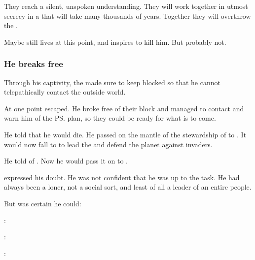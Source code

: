 They reach a silent, unspoken understanding. 
They will work together in utmost secrecy in a \XanatosGambit{} that will take many thousands of years. 
Together they will overthrow the \banes. 

Maybe \Damiarch{} still lives at this point, and \Nexagglachel{} inspires \Azraid{} to kill him. 
But probably not. 





\subsubsection{He breaks free}
Through his captivity, the \resphain{} made sure to keep \Nexagglachel{} blocked so that he cannot telepathically contact the outside world. 

At one point \Nexagglachel{} escaped. 
He broke free of their block and managed to contact \Ishnaruchaefir{} and warn him of the \ps{\resphain} plan, so they could be ready for what is to come. 

He told \Ishnaruchaefir{} that he would die. 
He passed on the mantle of the stewardship of \Miith{} to \Ishnaruchaefir. 
It would now fall to \Ishnaruchaefir{} to lead the \dragons{} and defend the planet against invaders. 

He told \Ishnaruchaefir{} of . 
Now he would pass it on to \Ishnaruchaefir. 

\Ishnaruchaefir{} expressed his doubt. 
He was not confident that he was up to the task. 
He had always been a loner, not a social sort, and least of all a leader of an entire people. 

But \Nexagglachel{} was certain he could: 
\begin{prose}
  \Ishnaruchaefir: 
  
  \Nexagglachel: 
  
  \Ishnaruchaefir:
\end{prose}

